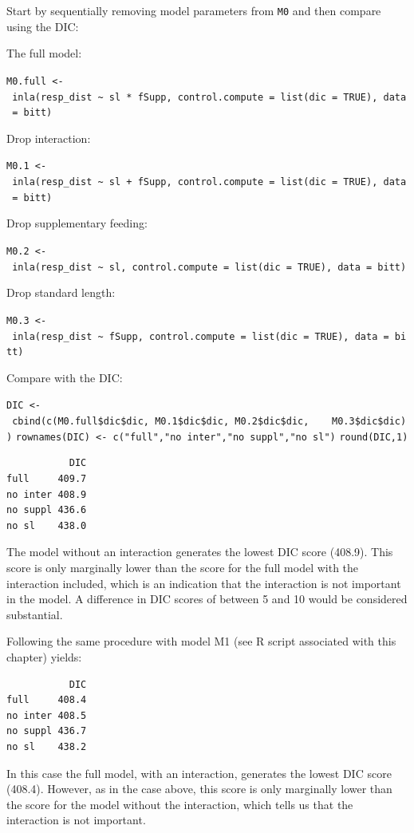 \documentclass[
]{book}
\begin{document}
Start by sequentially removing model parameters from \texttt{M0} and then compare using the DIC:

The full model:

\texttt{M0.full\ \textless{}-\ inla(resp\_dist\ \textasciitilde{}\ sl\ *\ fSupp,\ control.compute\ =\ list(dic\ =\ TRUE),\ data\ =\ bitt)}

Drop interaction:

\texttt{M0.1\ \textless{}-\ inla(resp\_dist\ \textasciitilde{}\ sl\ +\ fSupp,\ control.compute\ =\ list(dic\ =\ TRUE),\ data\ =\ bitt)}

Drop supplementary feeding:

\texttt{M0.2\ \textless{}-\ inla(resp\_dist\ \textasciitilde{}\ sl,\ control.compute\ =\ list(dic\ =\ TRUE),\ data\ =\ bitt)}

Drop standard length:

\texttt{M0.3\ \textless{}-\ inla(resp\_dist\ \textasciitilde{}\ fSupp,\ control.compute\ =\ list(dic\ =\ TRUE),\ data\ =\ bitt)}

Compare with the DIC:

\texttt{DIC\ \textless{}-\ cbind(c(M0.full\$dic\$dic,\ M0.1\$dic\$dic,\ M0.2\$dic\$dic,\ \ \ \ M0.3\$dic\$dic))}
\texttt{rownames(DIC)\ \textless{}-\ c("full","no\ inter","no\ suppl","no\ sl")}
\texttt{round(DIC,1)}

\begin{verbatim}
           DIC
full     409.7
no inter 408.9
no suppl 436.6
no sl    438.0
\end{verbatim}

The model without an interaction generates the lowest DIC score (408.9). This score is only marginally lower than the score for the full model with the interaction included, which is an indication that the interaction is not important in the model. A difference in DIC scores of between 5 and 10 would be considered substantial.

Following the same procedure with model M1 (see R script associated with this chapter) yields:

\begin{verbatim}
           DIC
full     408.4
no inter 408.5
no suppl 436.7
no sl    438.2
\end{verbatim}

In this case the full model, with an interaction, generates the lowest DIC score (408.4). However, as in the case above, this score is only marginally lower than the score for the model without the interaction, which tells us that the interaction is not important.
\end{document}
